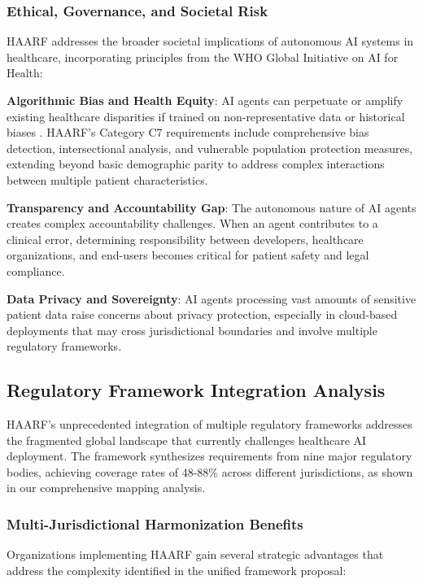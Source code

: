 \documentclass[11pt]{article}
\begin{document}
\subsubsection{Ethical, Governance, and Societal Risk}

HAARF addresses the broader societal implications of autonomous AI systems in healthcare, incorporating principles from the WHO Global Initiative on AI for Health:

\textbf{Algorithmic Bias and Health Equity}: AI agents can perpetuate or amplify existing healthcare disparities if trained on non-representative data or historical biases \cite{healthcanada2021sgba}. HAARF's Category C7 requirements include comprehensive bias detection, intersectional analysis, and vulnerable population protection measures, extending beyond basic demographic parity to address complex interactions between multiple patient characteristics.

\textbf{Transparency and Accountability Gap}: The autonomous nature of AI agents creates complex accountability challenges. When an agent contributes to a clinical error, determining responsibility between developers, healthcare organizations, and end-users becomes critical for patient safety and legal compliance.

\textbf{Data Privacy and Sovereignty}: AI agents processing vast amounts of sensitive patient data raise concerns about privacy protection, especially in cloud-based deployments that may cross jurisdictional boundaries and involve multiple regulatory frameworks.

\subsection{Regulatory Framework Integration Analysis}

HAARF's unprecedented integration of multiple regulatory frameworks addresses the fragmented global landscape that currently challenges healthcare AI deployment. The framework synthesizes requirements from nine major regulatory bodies, achieving coverage rates of 48-88\% across different jurisdictions, as shown in our comprehensive mapping analysis.

\subsubsection{Multi-Jurisdictional Harmonization Benefits}

Organizations implementing HAARF gain several strategic advantages that address the complexity identified in the unified framework proposal:
\end{document}
